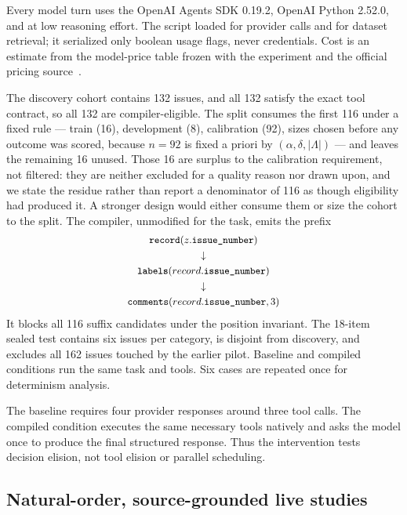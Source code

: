Every model turn uses the OpenAI Agents SDK 0.19.2, OpenAI Python 2.52.0, and
 at low reasoning effort.  The script loaded 
for provider calls and  for dataset retrieval; it serialized only boolean
usage flags, never credentials.  Cost is an estimate from the model-price table frozen
with the experiment and the official pricing source~\cite{openai2026pricing}.

The discovery cohort contains 132 issues, and all 132 satisfy the exact tool contract, so
all 132 are compiler-eligible.  The split consumes the first 116 under a fixed rule ---
train (16), development (8), calibration (92), sizes chosen before any outcome was scored,
because $n=92$ is fixed a priori by $(\alpha,\delta,|\Lambda|)$ --- and leaves the remaining
16 unused.  Those 16 are surplus to the calibration requirement, not filtered: they are
neither excluded for a quality reason nor drawn upon, and we state the residue rather than
report a denominator of 116 as though eligibility had produced it.  A stronger design would
either consume them or size the cohort to the split.  The compiler, unmodified
for the task, emits the prefix
\begin{equation*}
{\small\begin{gathered}
  \texttt{record}(z.\texttt{issue\_number}) \\
  \downarrow \\
  \texttt{labels}(record.\texttt{issue\_number}) \\
  \downarrow \\
  \texttt{comments}(record.\texttt{issue\_number},3)
\end{gathered}}
\end{equation*}
It blocks all 116 suffix candidates under the position invariant.  The 18-item sealed
test contains six issues per category, is disjoint from discovery, and excludes all 162
issues touched by the earlier pilot.  Baseline and compiled conditions run the same task
and tools.  Six cases are repeated once for determinism analysis.

The baseline requires four provider responses around three tool calls.  The compiled
condition executes the same necessary tools natively and asks the model once to produce
the final structured response.  Thus the intervention tests decision elision, not tool
elision or parallel scheduling.

\subsection{Natural-order, source-grounded live studies}
\label{sec:natural-method}

